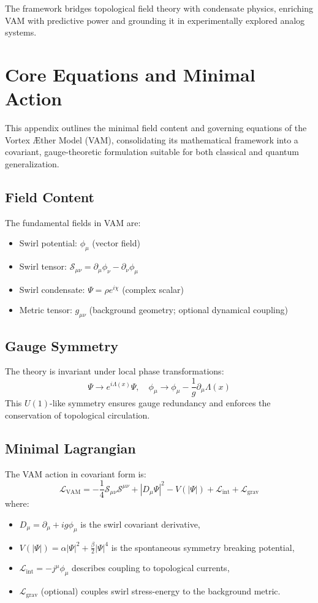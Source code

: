 The framework bridges topological field theory with condensate physics, enriching VAM with predictive power and grounding it in experimentally explored analog systems.

\section{Core Equations and Minimal Action}
This appendix outlines the minimal field content and governing equations of the Vortex \AE{}ther Model (VAM), consolidating its mathematical framework into a covariant, gauge-theoretic formulation suitable for both classical and quantum generalization.

\subsection{Field Content}
The fundamental fields in VAM are:
\begin{itemize}
    \item Swirl potential: $\phi_\mu$ (vector field)
    \item Swirl tensor: $\mathcal{S}_{\mu\nu} = \partial_\mu \phi_\nu - \partial_\nu \phi_\mu$
    \item Swirl condensate: $\Psi = \rho e^{i\chi}$ (complex scalar)
    \item Metric tensor: $g_{\mu\nu}$ (background geometry; optional dynamical coupling)
\end{itemize}

\subsection{Gauge Symmetry}
The theory is invariant under local phase transformations:
\begin{equation}
    \Psi \rightarrow e^{i\Lambda(x)} \Psi, \quad \phi_\mu \rightarrow \phi_\mu - \frac{1}{g} \partial_\mu \Lambda(x)
\end{equation}
This $U(1)$-like symmetry ensures gauge redundancy and enforces the conservation of topological circulation.

\subsection{Minimal Lagrangian}
The VAM action in covariant form is:
\begin{equation}
    \mathcal{L}_\text{VAM} = -\frac{1}{4} \mathcal{S}_{\mu\nu} \mathcal{S}^{\mu\nu} + |D_\mu \Psi|^2 - V(|\Psi|) + \mathcal{L}_{\text{int}} + \mathcal{L}_{\text{grav}}
\end{equation}
where:
\begin{itemize}
    \item $D_\mu = \partial_\mu + i g \phi_\mu$ is the swirl covariant derivative,
    \item $V(|\Psi|) = \alpha |\Psi|^2 + \frac{\beta}{2} |\Psi|^4$ is the spontaneous symmetry breaking potential,
    \item $\mathcal{L}_{\text{int}} = -j^\mu \phi_\mu$ describes coupling to topological currents,
    \item $\mathcal{L}_{\text{grav}}$ (optional) couples swirl stress-energy to the background metric.
\end{itemize}

